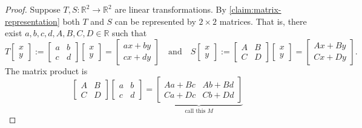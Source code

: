 \documentclass[10pt]{article}
\theoremstyle{definition}
\newcommand{\R}{\mathbb{R}}           %
\begin{document}
\begin{proof}
  Suppose $T,S:\R^{2}\to \R^{2}$ are linear transformations. By
  \cref{claim:matrix-representation} both
  $T$ and $S$ can be represented by $2\times 2$ matrices. That is, there exist
  $a,b,c,d,A,B,C,D\in \R$ such that
  \begin{equation*}
    T
    \begin{bmatrix}
      x\\y
    \end{bmatrix}
    :=
    \begin{bmatrix}
      a&b\\
      c&d
    \end{bmatrix}
    \begin{bmatrix}
      x\\y
    \end{bmatrix}
    =
    \begin{bmatrix}
      ax+by\\
      cx+dy
    \end{bmatrix}
    \quad \text{and} \quad
    S
    \begin{bmatrix}
      x\\y
    \end{bmatrix}
    :=
    \begin{bmatrix}
      A&B\\
      C&D
    \end{bmatrix}
    \begin{bmatrix}
      x\\y
    \end{bmatrix}
    =
    \begin{bmatrix}
      Ax+By\\
      Cx+Dy
    \end{bmatrix}.
  \end{equation*}
  The matrix product is
  \begin{equation*}
    \begin{bmatrix}
      A&B\\
      C&D
    \end{bmatrix}
    \begin{bmatrix}
      a&b\\
      c&d
    \end{bmatrix}
    =
    \underbrace{
      \begin{bmatrix}
      Aa+Bc&Ab+Bd\\
      Ca+Dc&Cb+Dd
    \end{bmatrix}}_{\text{call this }M}
  \end{equation*}
   

\end{proof}
\end{document}
